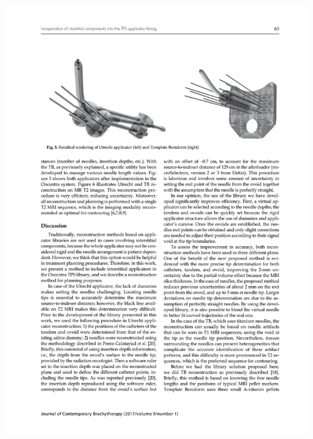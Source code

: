 \documentclass[
  a4paper,
]{scrreprt}
\begin{document}
\includegraphics{articulos/librerias/librerias-5.png}
\end{document}
